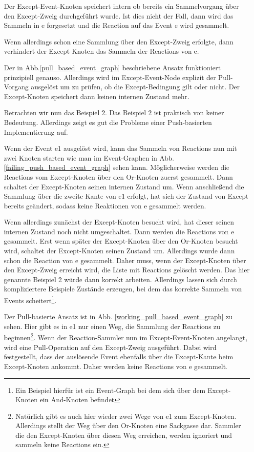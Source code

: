Der Except-Event-Knoten speichert intern ob bereits ein Sammelvorgang über den
Except-Zweig durchgeführt wurde. Ist dies nicht der Fall, dann wird das Sammeln
in e forgesetzt und die Reaction auf das Event e wird gesammelt. 

Wenn allerdings schon eine Sammlung über den Except-Zweig erfolgte, dann
verhindert der Except-Knoten das Sammeln der Reactions von e.

Der in Abb.\ref{pull_based_event_graph} beschriebene Ansatz funktioniert
prinzipiell genauso. Allerdings wird im Except-Event-Node explizit der Pull-Vorgang ausgelöst um zu
prüfen, ob die Except-Bedingung gilt oder nicht. Der Except-Knoten speichert
dann keinen internen Zustand mehr.

Betrachten wir nun das Beispiel 2. Das Beispiel 2 ist praktisch von keiner
Bedeutung. Allerdings zeigt es gut die Probleme einer Push-basierten
Implementierung auf. 

Wenn der Event e1 ausgelöst wird, kann das Sammeln von Reactions nun mit zwei
Knoten starten wie man im Event-Graphen in Abb.
\ref{failing_push_based_event_graph} sehen kann. Möglicherweise werden die
Reactions vom Except-Knoten über den Or-Knoten zuerst gesammelt. Dann schaltet 
der Except-Knoten seinen internen Zustand um. Wenn anschließend die Sammlung
über  die zweite Kante von e1 erfolgt, hat sich der Zustand von Except bereits 
geändert, sodass keine Reaktionen von e gesammelt werden.

Wenn allerdings zunächst der Except-Knoten besucht wird, hat dieser seinen
internen Zustand noch nicht umgeschaltet. Dann werden die Reactions von e
gesammelt. Erst wenn später der Except-Knoten über den Or-Knoten besucht wird,
schaltet der Except-Knoten seinen Zustand um. Allerdings wurde dann schon die
Reaction von e gesammelt. Daher muss, wenn der Except-Knoten über den
Except-Zweig erreicht wird, die Liste mit Reactions gelöscht werden. Das hier
genannte Beispiel 2 würde dann korrekt arbeiten. Allerdings lassen sich durch
kompliziertere Beispiele Zustände erzeugen, bei dem das korrekte Sammeln von
Events scheitert\footnote{Ein Beispiel hierfür ist ein Event-Graph bei dem sich
über dem Except-Knoten ein And-Knoten befindet}.

Der Pull-basierte Ansatz ist in Abb. \ref{working_pull_based_event_graph} zu
sehen. Hier gibt es in e1 nur einen Weg, die Sammlung der Reactions zu
beginnen\footnote{Natürlich gibt es auch hier wieder zwei Wege von e1 zum
Except-Knoten. Allerdings stellt der Weg über den Or-Knoten eine Sackgasse
dar. Sammler die den Except-Knoten über diesen Weg erreichen, werden ignoriert
und sammeln keine Reactions ein.}. Wenn der Reaction-Sammler nun im
Except-Event-Knoten angelangt, wird eine Pull-Operation auf den Except-Zweig ausgeführt. Dabei  wird
festgestellt, dass der auslösende Event ebenfalls über die Except-Kante beim 
Except-Knoten ankommt. Daher werden keine Reactions von e gesammelt.


